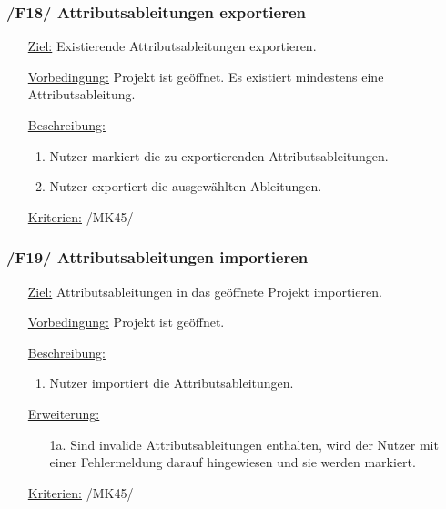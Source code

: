\documentclass{article}
\begin{document}
\subsubsection*{\textbf{/F18/} Attributsableitungen exportieren} \label{sec:f:Attributsableitungen exportieren}
\begin{itemize}
    \item[\underline{Ziel:}] Existierende Attributsableitungen exportieren.
    \item[\underline{Vorbedingung:}] Projekt ist geöffnet. Es existiert mindestens eine Attributsableitung.
    \item[\underline{Beschreibung:}]
    \begin{enumerate}
        \item Nutzer markiert die zu exportierenden Attributsableitungen.
        \item Nutzer exportiert die ausgewählten Ableitungen. 
    \end{enumerate}
    \item[\underline{Kriterien:}] /MK45/
\end{itemize}

\subsubsection*{\textbf{/F19/} Attributsableitungen importieren}
\label{sec:f:Attributsableitungen importieren}
\begin{itemize}
    \item[\underline{Ziel:}] Attributsableitungen in das geöffnete Projekt importieren.
    \item[\underline{Vorbedingung:}] Projekt ist geöffnet.
    \item[\underline{Beschreibung:}]
    \begin{enumerate}
        \item Nutzer importiert die Attributsableitungen. 
    \end{enumerate}
    \item[\underline{Erweiterung:}]
    \begin{itemize}
        \item[1a.] Sind invalide Attributsableitungen enthalten, wird der Nutzer mit einer Fehlermeldung darauf hingewiesen und sie werden markiert. 
    \end{itemize}
    \item[\underline{Kriterien:}] /MK45/
\end{itemize}
\end{document}
